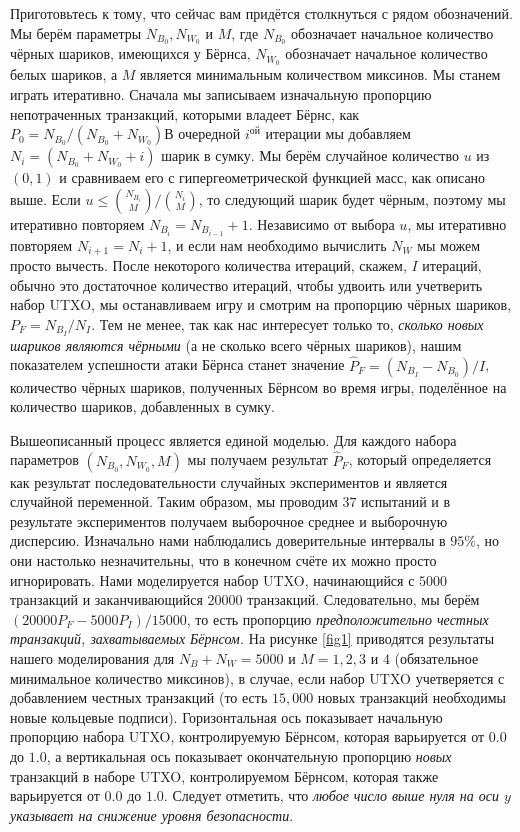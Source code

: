 \documentclass{mrl}
\begin{document}
Приготовьтесь к тому, что сейчас вам придётся столкнуться с рядом обозначений. Мы берём параметры $N_{B_0}, N_{W_0}$ и $M$, где $N_{B_0}$ обозначает начальное количество чёрных шариков, имеющихся у Бёрнса, $N_{W_0}$ обозначает начальное количество белых шариков, а $M$ является минимальным количеством миксинов. Мы станем играть итеративно. Сначала мы записываем изначальную пропорцию непотраченных транзакций, которыми владеет Бёрнс, как $P_0 = N_{B_0}/(N_{B_0} + N_{W_0})$В очередной $i^{ой}$ итерации мы добавляем $N_i = (N_{B_0} + N_{W_0} + i)$ шарик в сумку. Мы берём случайное количество $u$ из $(0,1)$ и сравниваем его с гипергеометрической функцией масс, как описано выше. Если $u \leq \binom{N_{B_i}}{M}/\binom{N_i}{M}$, то следующий шарик будет чёрным, поэтому мы итеративно повторяем $N_{B_i} = N_{B_{i-1}}+1$. Независимо от выбора $u$, мы итеративно повторяем $N_{i+1} = N_{i} + 1$, и если нам необходимо вычислить $N_W$ мы можем просто вычесть. После некоторого количества итераций, скажем, $I$ итераций, обычно это достаточное количество итераций, чтобы удвоить или учетверить набор UTXO, мы останавливаем игру и смотрим на пропорцию чёрных шариков, $P_F = N_{B_I}/N_I$. Тем не менее, так как нас интересует только то, \emph{сколько новых шариков являются чёрными} (а не сколько всего чёрных шариков), нашим показателем успешности атаки Бёрнса станет значение $\widehat{P}_F = (N_{B_I} - N_{B_0})/I$, количество чёрных шариков, полученных Бёрнсом во время игры, поделённое на количество шариков, добавленных в сумку.

Вышеописанный процесс является единой моделью. Для каждого набора параметров $(N_{B_0}, N_{W_0}, M)$ мы получаем результат $\widehat{P}_F$, который определяется как результат последовательности случайных экспериментов и является случайной переменной. Таким образом, мы проводим $37$ испытаний и в результате экспериментов получаем выборочное среднее и выборочную дисперсию. Изначально нами наблюдались доверительные интервалы в $95\%$, но они настолько незначительны, что в конечном счёте их можно просто игнорировать. Нами моделируется набор UTXO, начинающийся с $5000$ транзакций и заканчивающийся $20000$ транзакций. Следовательно, мы берём $(20000P_F - 5000P_I)/15000$, то есть пропорцию \emph{предположительно честных транзакций, захватываемых Бёрнсом.} На рисунке \ref{fig1} приводятся результаты нашего моделирования для $N_B+N_W = 5000$ и $M=1, 2, 3$ и $4$ (обязательное минимальное количество миксинов), в случае, если набор UTXO учетверяется с добавлением честных транзакций (то есть $15,000$ новых транзакций необходимы новые кольцевые подписи). Горизонтальная ось показывает начальную пропорцию набора UTXO, контролируемую Бёрнсом, которая варьируется от $0.0$ до $1.0$, а вертикальная ось показывает окончательную пропорцию \emph{новых} транзакций в наборе UTXO, контролируемом Бёрнсом, которая также варьируется от $0.0$ до $1.0$. Следует отметить, что \emph{любое число выше нуля на оси $y$ указывает на снижение уровня безопасности}.
\end{document}
